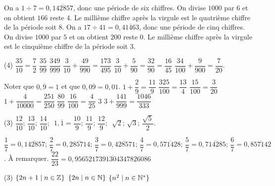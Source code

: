 \documentclass[a4paper,12pt]{report}
\begin{document}
\vspace*{-2\baselineskip}
\begin{core}
	\phantom{.}
	\begin{tasks}
		\task On a $1\div 7=0,\overline{142857}$, donc une période de six chiffres. On divise $1000$ par $6$ et on obtient $166$ reste $4$. Le millième chiffre après la virgule est le quatrième chiffre de la période soit $8$. 
		\task On a $17\div 41=0,\overline{41463}$, donc une période de cinq chiffres. On divise $1000$ par $5$ et on obtient $200$ reste $0$. Le millième chiffre après la virgule est le cinquième chiffre de la période soit $3$. 
	\end{tasks}
\end{core}
\begin{core}
	\phantom{.}
\begin{tasks}(4)
	\task $\dfrac{35}{10}=\dfrac{7}{2}$
	\task $\dfrac{35}{99}$
	\task $\dfrac{349}{999}$
	\task $\dfrac{3}{10}+\dfrac{49}{990}=\dfrac{173}{495}$
	\task $\dfrac{3}{10}+\dfrac{5}{90}=\dfrac{32}{90}=\dfrac{16}{45}$
	\task $\dfrac{34}{100}+\dfrac{9}{900}=\dfrac{7}{20}$. 

	Noter que $0,\overline{9}=1$ et que $0,0\overline{9}=0,01$.
	\task $1+\dfrac{2}{9}=\dfrac{11}{9}$
	\task $\dfrac{325}{100}=\dfrac{13}{4}$
	\task $\dfrac{15}{100}=\dfrac{3}{20}$
	\task $1+\dfrac{4}{10000}=\dfrac{251}{250}$
	\task $\dfrac{80}{99}$
	\task $\dfrac{16}{100}=\dfrac{4}{25}$
	\task $3$
	\task $3+\dfrac{141}{999}=\dfrac{1046}{333}$
\end{tasks}
\end{core}
\begin{core}
	\phantom{.}
	\begin{tasks}(3)
		\task $\dfrac{12}{10};\, \dfrac{13}{10};\,\dfrac{14}{10};\,$
		\task $1,\overline{1}=\dfrac{10}{9};\, \dfrac{11}{9};\, \dfrac{12}{9};\,$
		\task $\sqrt{2};\, \sqrt{3};\, \dfrac{\sqrt{5}}{2}.$	
	\end{tasks}
\end{core}
\begin{core}
	\phantom{.}
	\begin{tasks}
		\task $\dfrac{1}{7}=0,\overline{142857};\,\dfrac{2}{7}=0,\overline{285714};\,\dfrac{3}{7}=0,\overline{428571};\,\dfrac{4}{7}=0,\overline{571428};\,\dfrac{5}{7}=0,\overline{714285};\,\dfrac{6}{7}=0,\overline{857142}$.
		\task À remarquer.
		\task $\dfrac{22}{23}=0,\overline{9565217391304347826086}$
	\end{tasks}
\end{core}
\begin{core}
	\phantom{.}
	\begin{tasks}(3)
		\task $\{2n+1 \mid n\in \mathbb Z\}$
		\task $\{2n \mid n\in \mathbb N\}$
		\task $\{n^2 \mid n\in \mathbb N^*\}$
	\end{tasks}
\end{core}
\end{document}
